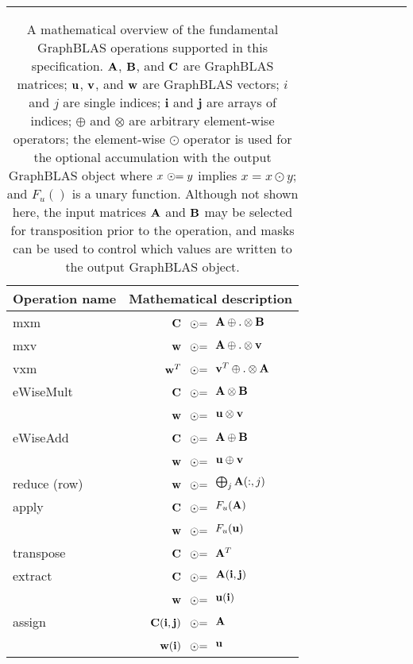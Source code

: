 \begin{table}[h]
\hrule
\begin{center}
\caption{A mathematical overview of the fundamental GraphBLAS operations supported
in this specification. ${\bf A}$, ${\bf B}$, and ${\bf C}$ are GraphBLAS matrices; 
${\bf u}$, ${\bf v}$, and ${\bf w}$ are GraphBLAS vectors; $i$ and $j$ are single indices;
$\mathbf{i}$ and $\mathbf{j}$ are arrays of indices;
$\oplus$ and $\otimes$ are arbitrary element-wise operators; the element-wise $\odot$
operator is used for the optional accumulation with the output GraphBLAS object where 
$x~\odot\hspace{-0.11cm}= y$ implies $x = x \odot y$; and $F_u()$ is a unary function.
Although not shown here, the input 
matrices ${\bf A}$ and ${\bf B}$ may be selected for transposition prior to 
the operation, and masks can be used to control which values are written to the output GraphBLAS object.
\label{Tab:GraphBLASOps}}
\newcommand{\odotequals}{~\odot\hspace{-0.09cm}=\hspace{-0.2cm}}
\begin{tabular}{l|rl}
{\sf Operation name} & \multicolumn{2}{c}{Mathematical description}  \\
\hline
{\sf mxm}          & ${\bf C}$    $\odotequals$ & ${\bf A} \oplus.\otimes {\bf B}$ \\
{\sf mxv}          & ${\bf w}$    $\odotequals$ & ${\bf A} \oplus.\otimes {\bf v}$ \\
{\sf vxm}          & ${\bf w}^T$  $\odotequals$ & ${\bf v}^T \oplus.\otimes {\bf A}$  \\
{\sf eWiseMult}    & ${\bf C}$    $\odotequals$ & ${\bf A} \otimes {\bf B}$ \\
                   & ${\bf w}$    $\odotequals$ & ${\bf u} \otimes {\bf v}$ \\
{\sf eWiseAdd}     & ${\bf C}$    $\odotequals$ & ${\bf A} \oplus {\bf B}$ \\
                   & ${\bf w}$    $\odotequals$ & ${\bf u} \oplus {\bf v}$ \\
{\sf reduce} (row) & ${\bf w}$    $\odotequals$ & $\bigoplus_j{\bf A}(:,j)$  \\
{\sf apply}        & ${\bf C}$    $\odotequals$ & $F_u({\bf A})$ \\
                   & ${\bf w}$    $\odotequals$ & $F_u({\bf u})$ \\
{\sf transpose}    & ${\bf C}$    $\odotequals$ & ${\bf A}^T$ \\
{\sf extract}      & ${\bf C}$    $\odotequals$ & ${\bf A}({\bf i},{\bf j})$ \\
                   & ${\bf w}$    $\odotequals$ & ${\bf u}({\bf i})$ \\
{\sf assign}       & ${\bf C}({\bf i},{\bf j})$  $\odotequals$ &  ${\bf A}$ \\
                   & ${\bf w}({\bf i})$  $\odotequals$ & ${\bf u}$ 
\end{tabular}


\end{center}
\end{table}
